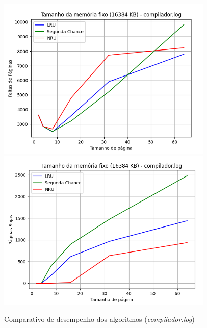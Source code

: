 \documentclass[a4paper, 12pt]{article}
\begin{document}
\begin{figure}[H]
    \centering
    \includegraphics[width=0.92\textwidth]{fixed_mem/compilador/fault.png}
    \hspace{1.5cm}
    \includegraphics[width=0.92\textwidth]{fixed_mem/compilador/write.png}
    \caption{Comparativo de desempenho dos algoritmos (\emph{compilador.log})}
    \label{fig:exampleFig2}
\end{figure}
\end{document}
